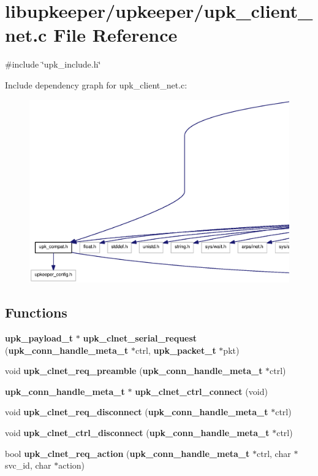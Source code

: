 \section{libupkeeper/upkeeper/upk\_\-client\_\-net.c File Reference}
\label{upk__client__net_8c}
{\ttfamily \#include \char`\"{}upk\_\-include.h\char`\"{}}\par
Include dependency graph for upk\_\-client\_\-net.c:\nopagebreak
\begin{figure}[H]
\begin{center}
\leavevmode
\includegraphics[width=400pt]{upk__client__net_8c__incl}
\end{center}
\end{figure}
\subsection*{Functions}
\begin{DoxyCompactItemize}
\item 
{\bf upk\_\-payload\_\-t} $\ast$ {\bf upk\_\-clnet\_\-serial\_\-request} ({\bf upk\_\-conn\_\-handle\_\-meta\_\-t} $\ast$ctrl, {\bf upk\_\-packet\_\-t} $\ast$pkt)
\item 
void {\bf upk\_\-clnet\_\-req\_\-preamble} ({\bf upk\_\-conn\_\-handle\_\-meta\_\-t} $\ast$ctrl)
\item 
{\bf upk\_\-conn\_\-handle\_\-meta\_\-t} $\ast$ {\bf upk\_\-clnet\_\-ctrl\_\-connect} (void)
\item 
void {\bf upk\_\-clnet\_\-req\_\-disconnect} ({\bf upk\_\-conn\_\-handle\_\-meta\_\-t} $\ast$ctrl)
\item 
void {\bf upk\_\-clnet\_\-ctrl\_\-disconnect} ({\bf upk\_\-conn\_\-handle\_\-meta\_\-t} $\ast$ctrl)
\item 
bool {\bf upk\_\-clnet\_\-req\_\-action} ({\bf upk\_\-conn\_\-handle\_\-meta\_\-t} $\ast$ctrl, char $\ast$svc\_\-id, char $\ast$action)
\end{DoxyCompactItemize}


